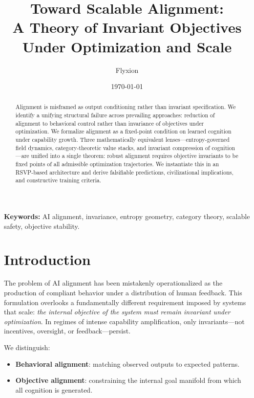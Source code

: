 \documentclass[11pt,a4paper]{article}
\title{Toward Scalable Alignment:\\A Theory of Invariant Objectives Under Optimization and Scale}
\author{Flyxion}
\date{\today}
\theoremstyle{plain}
\theoremstyle{definition}
\numberwithin{equation}{section}
\begin{document}
\maketitle

\begin{abstract}
Alignment is misframed as output conditioning rather than invariant specification. We identify a unifying structural failure across prevailing approaches: reduction of alignment to behavioral control rather than invariance of objectives under optimization. We formalize alignment as a fixed-point condition on learned cognition under capability growth. Three mathematically equivalent lenses---entropy-governed field dynamics, category-theoretic value stacks, and invariant compression of cognition---are unified into a single theorem: robust alignment requires objective invariants to be fixed points of all admissible optimization trajectories. We instantiate this in an RSVP-based architecture and derive falsifiable predictions, civilizational implications, and constructive training criteria.
\end{abstract}

\textbf{Keywords:} AI alignment, invariance, entropy geometry, category theory, scalable safety, objective stability.


\section{Introduction}

The problem of AI alignment has been mistakenly operationalized as the production of compliant behavior under a distribution of human feedback. This formulation overlooks a fundamentally different requirement imposed by systems that scale: \emph{the internal objective of the system must remain invariant under optimization}. In regimes of intense capability amplification, only invariants---not incentives, oversight, or feedback---persist.

We distinguish:

\begin{itemize}
    \item \textbf{Behavioral alignment}: matching observed outputs to expected patterns.
    \item \textbf{Objective alignment}: constraining the internal goal manifold from which all cognition is generated.
\end{itemize}
\end{document}
